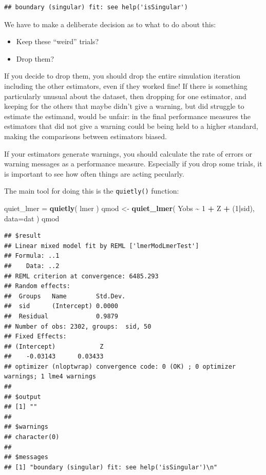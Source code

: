 \documentclass[
]{book}
\newenvironment{Shaded}{\begin{snugshade}}{\end{snugshade}}
\newcommand{\AttributeTok}[1]{\textcolor[rgb]{0.13,0.29,0.53}{#1}}
\newcommand{\DecValTok}[1]{\textcolor[rgb]{0.00,0.00,0.81}{#1}}
\newcommand{\FunctionTok}[1]{\textcolor[rgb]{0.13,0.29,0.53}{\textbf{#1}}}
\newcommand{\NormalTok}[1]{#1}
\newcommand{\OtherTok}[1]{\textcolor[rgb]{0.56,0.35,0.01}{#1}}
\newcommand{\SpecialCharTok}[1]{\textcolor[rgb]{0.81,0.36,0.00}{\textbf{#1}}}
\providecommand{\tightlist}{%
  \setlength{\itemsep}{0pt}\setlength{\parskip}{0pt}}
\begin{document}
\begin{verbatim}
## boundary (singular) fit: see help('isSingular')
\end{verbatim}

We have to make a deliberate decision as to what to do about this:

\begin{itemize}
\tightlist
\item
  Keep these ``weird'' trials?
\item
  Drop them?
\end{itemize}

If you decide to drop them, you should drop the entire simulation iteration including the other estimators, even if they worked fine!
If there is something particularly unusual about the dataset, then dropping for one estimator, and keeping for the others that maybe didn't give a warning, but did struggle to estimate the estimand, would be unfair: in the final performance measures the estimators that did not give a warning could be being held to a higher standard, making the comparisons between estimators biased.

If your estimators generate warnings, you should calculate the rate of errors or warning messages as a performance measure.
Especially if you drop some trials, it is important to see how often things are acting pecularly.

The main tool for doing this is the \texttt{quietly()} function:

\begin{Shaded}
\begin{Highlighting}[]
\NormalTok{quiet\_lmer }\OtherTok{=} \FunctionTok{quietly}\NormalTok{( lmer )}
\NormalTok{qmod }\OtherTok{\textless{}{-}} \FunctionTok{quiet\_lmer}\NormalTok{( Yobs }\SpecialCharTok{\textasciitilde{}} \DecValTok{1} \SpecialCharTok{+}\NormalTok{ Z }\SpecialCharTok{+}\NormalTok{ (}\DecValTok{1}\SpecialCharTok{|}\NormalTok{sid), }\AttributeTok{data=}\NormalTok{dat )}
\NormalTok{qmod}
\end{Highlighting}
\end{Shaded}

\begin{verbatim}
## $result
## Linear mixed model fit by REML ['lmerModLmerTest']
## Formula: ..1
##    Data: ..2
## REML criterion at convergence: 6485.293
## Random effects:
##  Groups   Name        Std.Dev.
##  sid      (Intercept) 0.0000  
##  Residual             0.9879  
## Number of obs: 2302, groups:  sid, 50
## Fixed Effects:
## (Intercept)            Z  
##    -0.03143      0.03433  
## optimizer (nloptwrap) convergence code: 0 (OK) ; 0 optimizer warnings; 1 lme4 warnings 
## 
## $output
## [1] ""
## 
## $warnings
## character(0)
## 
## $messages
## [1] "boundary (singular) fit: see help('isSingular')\n"
\end{verbatim}
\end{document}
